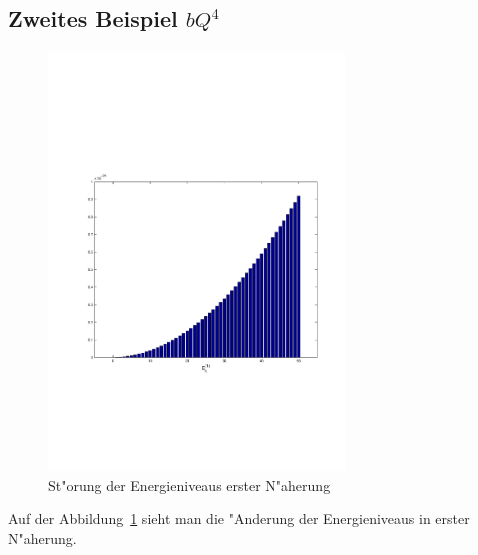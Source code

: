 \begin{refsection}
\subsection{Zweites Beispiel $bQ^4$}

\begin{figure}[h]	%
\centering
\includegraphics[width=0.7\textwidth]{anharmonisch/images/x4/EK1.pdf}
\caption{St"orung der Energieniveaus erster N"aherung
\label{skript:x4_EK1}}
\end{figure}

Auf der Abbildung~\ref{skript:x4_EK1} sieht man die "Anderung der Energieniveaus in erster N"aherung. 


\end{refsection}
